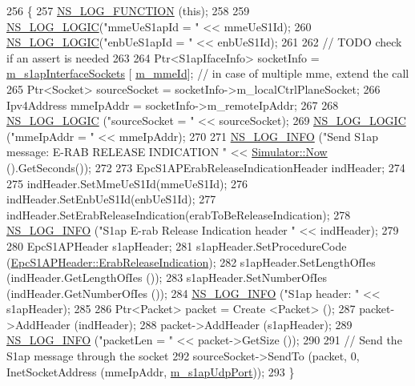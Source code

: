 \begin{DoxyCode}
256 \{
257   \hyperlink{log-macros-disabled_8h_a90b90d5bad1f39cb1b64923ea94c0761}{NS\_LOG\_FUNCTION} (\textcolor{keyword}{this});
258 
259   \hyperlink{group__logging_ga88acd260151caf2db9c0fc84997f45ce}{NS\_LOG\_LOGIC}(\textcolor{stringliteral}{"mmeUeS1apId = "} << mmeUeS1Id);
260   \hyperlink{group__logging_ga88acd260151caf2db9c0fc84997f45ce}{NS\_LOG\_LOGIC}(\textcolor{stringliteral}{"enbUeS1apId = "} << enbUeS1Id);
261 
262   \textcolor{comment}{// TODO check if an assert is needed}
263 
264   Ptr<S1apIfaceInfo> socketInfo = \hyperlink{classns3_1_1EpcS1apEnb_ad91b3139b21bd084edf401249d4e4233}{m\_s1apInterfaceSockets} [
      \hyperlink{classns3_1_1EpcS1apEnb_a44a703502c1439b86664b12751b15d69}{m\_mmeId}]; \textcolor{comment}{// in case of multiple mme, extend the call}
265   Ptr<Socket> sourceSocket = socketInfo->m\_localCtrlPlaneSocket;
266   Ipv4Address mmeIpAddr = socketInfo->m\_remoteIpAddr;
267 
268   \hyperlink{group__logging_ga88acd260151caf2db9c0fc84997f45ce}{NS\_LOG\_LOGIC} (\textcolor{stringliteral}{"sourceSocket = "} << sourceSocket);
269   \hyperlink{group__logging_ga88acd260151caf2db9c0fc84997f45ce}{NS\_LOG\_LOGIC} (\textcolor{stringliteral}{"mmeIpAddr = "} << mmeIpAddr);
270 
271   \hyperlink{group__logging_gafbd73ee2cf9f26b319f49086d8e860fb}{NS\_LOG\_INFO} (\textcolor{stringliteral}{"Send S1ap message: E-RAB RELEASE INDICATION "} << 
      \hyperlink{classns3_1_1Simulator_ac3178fa975b419f7875e7105be122800}{Simulator::Now} ().GetSeconds());
272 
273   EpcS1APErabReleaseIndicationHeader indHeader;
274   
275   indHeader.SetMmeUeS1Id(mmeUeS1Id);
276   indHeader.SetEnbUeS1Id(enbUeS1Id);
277   indHeader.SetErabReleaseIndication(erabToBeReleaseIndication);
278   \hyperlink{group__logging_gafbd73ee2cf9f26b319f49086d8e860fb}{NS\_LOG\_INFO} (\textcolor{stringliteral}{"S1ap E-rab Release Indication header "} << indHeader);
279 
280   EpcS1APHeader s1apHeader;
281   s1apHeader.SetProcedureCode (\hyperlink{classns3_1_1EpcS1APHeader_aedd7ba8568bf04ce8960bd840712a63eacba9fcdd89b080f9511a1de3dea78cf0}{EpcS1APHeader::ErabReleaseIndication});
282   s1apHeader.SetLengthOfIes (indHeader.GetLengthOfIes ());
283   s1apHeader.SetNumberOfIes (indHeader.GetNumberOfIes ());
284   \hyperlink{group__logging_gafbd73ee2cf9f26b319f49086d8e860fb}{NS\_LOG\_INFO} (\textcolor{stringliteral}{"S1ap header: "} << s1apHeader);
285 
286   Ptr<Packet> packet = Create <Packet> ();
287   packet->AddHeader (indHeader);
288   packet->AddHeader (s1apHeader);
289   \hyperlink{group__logging_gafbd73ee2cf9f26b319f49086d8e860fb}{NS\_LOG\_INFO} (\textcolor{stringliteral}{"packetLen = "} << packet->GetSize ());
290 
291   \textcolor{comment}{// Send the S1ap message through the socket}
292   sourceSocket->SendTo (packet, 0, InetSocketAddress (mmeIpAddr, \hyperlink{classns3_1_1EpcS1apEnb_ae06c681ae6a91dc4729408d0a7b4dd39}{m\_s1apUdpPort}));
293 \}
\end{DoxyCode}


